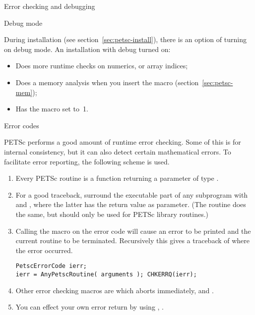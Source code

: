 
 {Error checking and debugging}

 {Debug mode}
\label{sec:petsc-debug-mode}

During installation (see section~\ref{sec:petsc-install}),
there is an option of turning on debug mode.
An installation with debug turned on:
\begin{itemize}
\item Does more runtime checks on numerics, or array indices;
\item Does a memory analysis when you insert the  macro
  (section~\ref{sec:petsc-mem});
\item Has the macro  set to~1.
\end{itemize}

 {Error codes}
\label{sec:petsc-error}

PETSc performs a good amount of runtime error checking. Some of this
is for internal consistency, but it can also detect certain
mathematical errors. To facilitate error reporting, the following
scheme is used.
\begin{enumerate}
\item Every PETSc routine is a function returning a parameter of type
  .
\item For a good traceback, surround the executable part of any subprogram
  with  and ,
  where the latter has the return value as parameter.
  (The routine  does the same, but
  should only be used for PETSc library routines.)
\item Calling the macro  on the error code will
  cause an error to be printed and the current routine to be
  terminated. Recursively this gives a traceback of where the error
  occurred.
\begin{lstlisting}
PetscErrorCode ierr;
ierr = AnyPetscRoutine( arguments ); CHKERRQ(ierr);
\end{lstlisting}
\item Other error checking macros are 
  which aborts immediately, and .
\item You can effect your own error return by using
  ,
  .
\end{enumerate}

